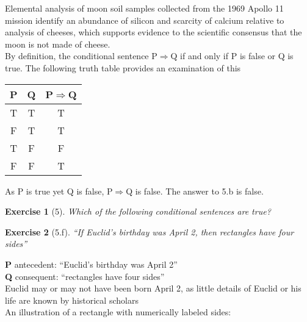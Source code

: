 \documentclass[11pt]{article}
\theoremstyle{quest}
\newtheorem*{exercise}{Exercise}
\begin{document}
\noindent Elemental analysis of moon soil samples collected from the 1969 Apollo 
11 mission identify an abundance of silicon and scarcity of calcium relative to 
analysis of cheeses, which supports evidence to the scientific consensus that the moon is not made of 
cheese.\\

\noindent By definition, the conditional sentence P$\Rightarrow$Q if and only if P is 
false or Q is true. The following truth table provides an examination of this

\begin{table}[ht] 
\centering %
\begin{tabular}{c c c } %
\hline\hline %
P & Q & P$\Rightarrow$Q \\ [0.5ex] %
\hline %
T & T & T \\ %
F & T & T \\
T & F & F \\
F & F & T \\ [1ex] %
\hline %
\end{tabular} 
\end{table}

\noindent As P is true yet Q is false, P$\Rightarrow$Q is false. The answer to 5.b is 
false.

\newpage

\begin{exercise}[5]
Which of the following conditional sentences are true?
\end{exercise}
\begin{exercise}[5.f]
  ``If Euclid's birthday was April 2, then rectangles have four sides''
\end{exercise}
\noindent \textbf{P} antecedent: ``Euclid's birthday was April 2'' \\
\textbf{Q} consequent: ``rectangles have four sides'' \\

\noindent Euclid may or may not have been born April 2, as little details of Euclid or his life are known by historical scholars\\

\noindent An illustration of a rectangle with numerically labeled sides:
\\\vspace{1in}
\end{document}
